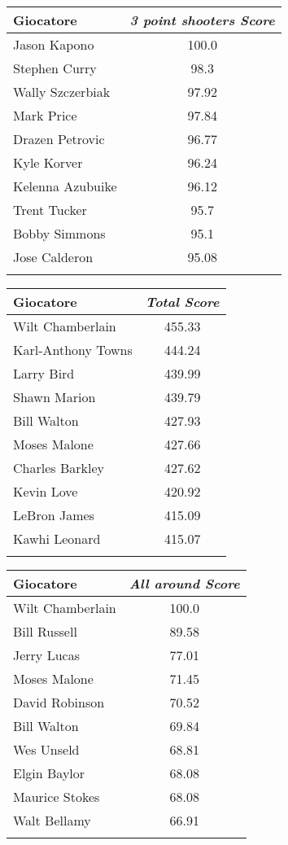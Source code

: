 \documentclass[10pt,a4paper,twocolumn]{article}
\begin{document}
\begin{table*}[t]
	
	\parbox{.45\linewidth}{
		\begin{tabular}{lc}
			Giocatore & \textit{3 point shooters Score}  \\
			\hline
			Jason Kapono & 100.0\\
			Stephen Curry & 98.3\\
			Wally Szczerbiak & 97.92\\
			Mark Price & 97.84\\
			Drazen Petrovic & 96.77\\
			Kyle Korver & 96.24\\
			Kelenna Azubuike & 96.12\\
			Trent Tucker & 95.7\\
			Bobby Simmons & 95.1\\
			Jose Calderon & 95.08\\
			&\\
			
		\end{tabular}
	}
	\quad
	\hspace{19pt}
	\parbox{.45\linewidth}{
		\begin{tabular}{lc}
			Giocatore & \textit{Total Score}  \\
			\hline
			Wilt Chamberlain & 455.33\\
			Karl-Anthony Towns & 444.24\\
			Larry Bird & 439.99\\
			Shawn Marion & 439.79\\
			Bill Walton & 427.93\\
			Moses Malone & 427.66\\
			Charles Barkley & 427.62\\
			Kevin Love & 420.92\\
			LeBron James & 415.09\\
			Kawhi Leonard & 415.07\\
			&\\
			
	\end{tabular}}
	
	\parbox{.45\linewidth}{
		\begin{tabular}{lc}
			Giocatore & \textit{All around Score}  \\
			\hline
			Wilt Chamberlain & 100.0\\
			Bill Russell & 89.58\\
			Jerry Lucas & 77.01\\
			Moses Malone & 71.45\\
			David Robinson & 70.52\\
			Bill Walton & 69.84\\
			Wes Unseld & 68.81\\
			Elgin Baylor & 68.08\\
			Maurice Stokes & 68.08\\
			Walt Bellamy & 66.91\\
			&\\
			

\end{tabular}}
\end{table*}
\end{document}
